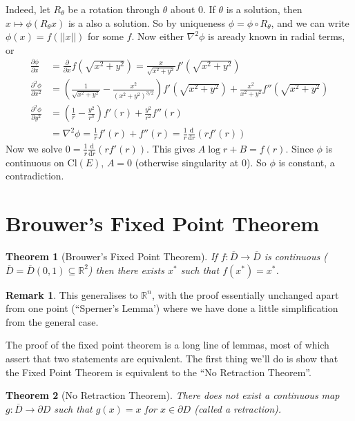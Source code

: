 \documentclass[a4paper, 10pt, twocolumn]{amsart}
\newtheorem*{theorem}{Theorem}
\theoremstyle{definition}
\newtheorem*{remark}{Remark}
\newcommand{\bb}[1]{\mathbb{#1}}
\newcommand{\sbs}[0]{\subseteq}
\newcommand{\Cl}[0]{\text{Cl}}
\newcommand{\1}{\mathbbm{1}}
\newcommand{\pdv}[2]{\frac{\partial #1}{\partial #2}}
\newcommand{\dv}[2]{\frac{\mathrm{d} #1}{\mathrm{d} #2}}
\begin{document}
Indeed, let $R_\theta$ be a rotation through $\theta$ about $0$. If $\theta$ is a solution, then $x \mapsto \phi(R_\theta x)$ is a also a solution. So by uniqueness $\phi = \phi \circ R_\theta$, and we can write $\phi(x) = f(||x||)$ for some $f$. Now either $\nabla^2 \phi$ is aready known in radial terms, or \begin{align*}
    \pdv{\phi}{x} &= \pdv{}{x} f(\sqrt{x^2+y^2}) = \frac{x}{\sqrt{x^2+y^2}} f'(\sqrt{x^2+y^2})\\
    \pdv{^2\phi}{x^2} &=  \left(\frac{1}{\sqrt{x^2+y^2}} -\frac{x^2}{(x^2+y^2)^{3/2}} \right)f'(\sqrt{x^2+y^2}) + \frac{x^2}{x^2+y^2} f''(\sqrt{x^2+y^2})\\
    \pdv{^2\phi}{y^2}&= \left(\frac{1}{r}-\frac{y^2}{r^3}\right) f'(r) + \frac{y^2}{r^2} f''(r)\\
    &= \nabla^2\phi = \frac{1}{r} f'(r) + f''(r) = \frac{1}{r} \dv{}{r}(rf'(r))
\end{align*}
Now we solve $0 = \frac{1}{r}\dv{}{r}(rf'(r))$. This gives $A\log{r}+B = f(r)$. Since $\phi$ is continuous on $\Cl(E)$, $A=0$ (otherwise singularity at $0$). So $\phi$ is constant, a contradiction.

\section{Brouwer's Fixed Point Theorem}

\begin{theorem}[Brouwer's Fixed Point Theorem]
    If $f: \overline{D} \to \overline{D}$ is continuous ($\overline{D} = \overline{D}(0,1) \sbs \bb{R}^2$) then there exists $x^\ast$ such that $f(x^\ast) = x^\ast$. 
\end{theorem}

\begin{remark}
    This generalises to $\bb{R}^n$, with the proof essentially unchanged apart from one point (``Sperner's Lemma') where we have done a little simplification from the general case.
\end{remark}

The proof of the fixed point theorem is a long line of lemmas, most of which assert that two statements are equivalent.
The first thing we'll do is show that the Fixed Point Theorem is equivalent to the ``No Retraction Theorem''.

\begin{theorem}[No Retraction Theorem]
    There does not exist a continuous map $g: \overline{D} \to \partial D$ such that $g(x) = x$ for $x \in \partial D$ (called a retraction). 
\end{theorem}
\end{document}
